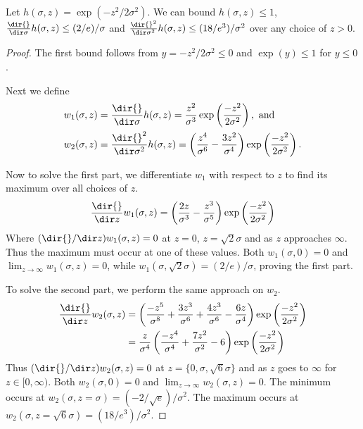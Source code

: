 \documentclass[11pt]{myclass}
\begin{document}
\begin{lemma}
Let $h(\sigma,z) = \exp(-z^2/2\sigma^2)$.  We can bound
$h(\sigma,z) \leq 1$, 
$\frac{\dir{}}{\dir \sigma} h(\sigma,z) \leq (2/e)/\sigma$ and 
$\frac{\dir{}^2}{\dir \sigma^2} h(\sigma,z) \leq (18/e^{3})/ \sigma^2$ over any choice of $z>0$.  
\label{lem:h-max}
\end{lemma}
\begin{proof}
The first bound follows from $y = -z^2/2\sigma^2 \leq 0$ and $\exp(y) \leq 1$ for $y\leq 0$. 

Next we define
\begin{align*}
w_1(\sigma,z) &= \frac{\dir{}}{\dir \sigma} h(\sigma,z) = \frac{z^2}{\sigma^3} \exp\left(\frac{-z^2}{2 \sigma^2}\right), \text{ and}
\\
w_2(\sigma,z) &= \frac{\dir{}^2}{\dir \sigma^2} h(\sigma,z) = \left(\frac{z^4}{\sigma^6} - \frac{3 z^2}{\sigma^4} \right) \exp\left(\frac{-z^2}{2 \sigma^2}\right). 
\end{align*}

Now to solve the first part, we differentiate $w_1$ with respect to $z$ to find its maximum over all choices of $z$.  
\[
\frac{\dir{}}{\dir z} w_1(\sigma,z) = \left(\frac{2 z}{\sigma^3} - \frac{z^3}{\sigma^5}\right) \exp\left(\frac{-z^2}{2 \sigma^2}\right)
\]
Where $(\dir{} / \dir z) w_1(\sigma,z) = 0$ at $z=0$, $z=\sqrt{2}\sigma$ and as $z$ approaches $\infty$.  Thus the maximum must occur at one of these values.  Both $w_1(\sigma,0) = 0$ and $\lim_{z \to \infty} w_1(\sigma,z) = 0$, while $w_1(\sigma,\sqrt{2}\sigma) = (2/e)/\sigma$, proving the first part.  

To solve the second part, we perform the same approach on $w_2$.  
\begin{align*}
\frac{\dir{}}{\dir z} w_2(\sigma,z) 
&= 
\left(\frac{- z^5}{\sigma^8} + \frac{3 z^3}{\sigma^6} + \frac{4z^3}{\sigma^6} - \frac{6z}{\sigma^4}\right) \exp\left(\frac{-z^2}{2 \sigma^2}\right)
\\ &= 
\frac{z}{\sigma^4} \left(\frac{- z^4}{\sigma^4} + \frac{7 z^2}{\sigma^2} - 6\right) \exp\left(\frac{-z^2}{2 \sigma^2}\right) 
\end{align*}
Thus $(\dir{} / \dir z) w_2(\sigma,z) = 0$ at $z=\{0, \sigma, \sqrt{6}\sigma\}$ and as $z$ goes to $\infty$ for $z \in [0,\infty)$.  Both $w_2(\sigma,0) = 0$ and $\lim_{z \to \infty} w_2(\sigma,z) = 0$.  The minimum occurs at $w_2(\sigma,z=\sigma) = (-2/\sqrt{e})/\sigma^2$.  
The maximum occurs at $w_2(\sigma,z=\sqrt{6}\sigma) = (18/e^{3})/\sigma^2$.  
\end{proof}
\end{document}
